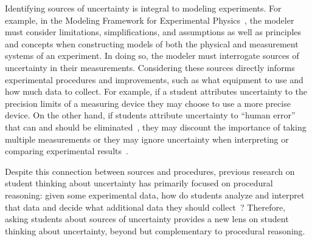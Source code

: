 \documentclass[english,aps,prstper,reprint,showpacs,longbibliography,superscriptaddress,nofootinbib]{revtex4-2}
\begin{document}
Identifying sources of uncertainty is integral to modeling experiments. For example, in the Modeling Framework for Experimental Physics~\cite{DounasFrazer2018,Zwickl2015}, the modeler must consider limitations, simplifications, and assumptions as well as principles and concepts when constructing models of both the physical and measurement systems of an experiment. In doing so, the modeler must interrogate sources of uncertainty in their measurements.
Considering these sources directly informs experimental procedures and improvements, such as what equipment to use and how much data to collect. For example, if a student attributes uncertainty to the precision limits of a measuring device they may choose to use a more precise device. On the other hand, if students attribute uncertainty to ``human error'' that can and should be eliminated~\cite{Holmes2015,Hu2018,Sere2001,Hull2021}, they may discount the importance of taking multiple measurements or they may ignore uncertainty when interpreting or comparing experimental results~\cite{Pillay2008,Evangelinos2002}.

Despite this connection between sources and procedures, previous research on student thinking about uncertainty has primarily focused on procedural reasoning: given some experimental data, how do students analyze and interpret that data and decide what additional data they should collect~\cite[e.g.,][]{Hull2021,Sere1993,Evangelinos1999,Leach1998,Allie1998,Lubben2001,Buffler2001,vanKampen2021,Kung2005,Pollard2020,Volkwyn2008}? %
Therefore, asking students about sources of uncertainty provides a new lens on student thinking about uncertainty, beyond but complementary to procedural reasoning.  
\end{document}
